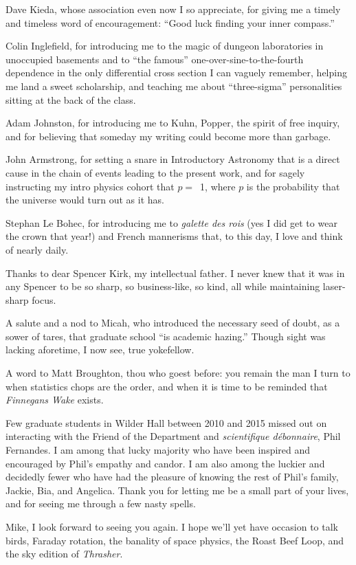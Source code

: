Dave Kieda, whose association even now I so appreciate, for giving me a timely
and timeless word of encouragement: ``Good luck finding your inner compass.''

Colin Inglefield, for introducing me to the magic of dungeon laboratories in
unoccupied basements and to ``the famous'' one-over-sine-to-the-fourth
dependence in the only differential cross section I can vaguely remember,
helping me land a sweet scholarship, and teaching me about ``three-sigma''
personalities sitting at the back of the class.

Adam Johnston, for introducing me to Kuhn, Popper, the spirit of free inquiry,
and for believing that someday my writing could become more than garbage.

John Armstrong, for setting a snare in Introductory Astronomy that is a direct
cause in the chain of events leading to the present work, and for sagely
instructing my intro physics cohort that $p =$~1, where $p$ is the probability
that the universe would turn out as it has.

Stephan Le Bohec, for introducing me to \emph{galette des rois} (yes I did
get to wear the crown that year!) and French mannerisms that, to this day, I
love and think of nearly daily.

Thanks to dear Spencer Kirk, my intellectual father. I never knew that it was in
any Spencer to be so sharp, so business-like, so kind, all while maintaining
laser-sharp focus.

A salute and a nod to Micah, who introduced the necessary seed of doubt, as a
sower of tares, that graduate school ``is academic hazing.'' Though sight was
lacking aforetime, I now see, true yokefellow.

A word to Matt Broughton, thou who goest before: you remain the man I turn to
when statistics chops are the order, and when it is time to be reminded that
\textit{Finnegans Wake} exists.

Few graduate students in Wilder Hall between 2010 and 2015 missed out on
interacting with the Friend of the Department and \textit{scientifique
  d\'{e}bonnaire}, Phil Fernandes. I am among that lucky majority who have been
inspired and encouraged by Phil's empathy and candor. I am also among the
luckier and decidedly fewer who have had the pleasure of knowing the rest of
Phil's family, Jackie, Bia, and Angelica. Thank you for letting me be a small
part of your lives, and for seeing me through a few nasty spells.

Mike, I look forward to seeing you again. I hope we'll yet have occasion to talk
birds, Faraday rotation, the banality of space physics, the Roast Beef Loop, and
the sky edition of \textit{Thrasher}.

